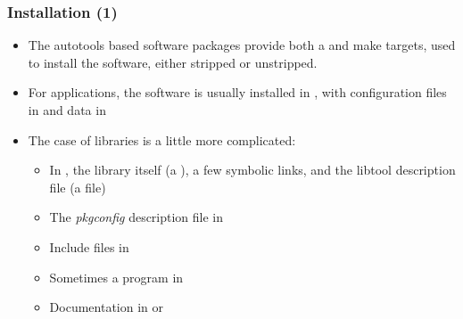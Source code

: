\begin{frame}
  \frametitle{Installation (1)}
  \begin{itemize}
  \item The autotools based software packages provide both a
     and  make targets, used to
    install the software, either stripped or unstripped.
  \item For applications, the software is usually installed in
    , with configuration files in
     and data in
  \item The case of libraries is a little more complicated:
    \begin{itemize}
    \item In , the library itself (a
      ), a few symbolic links, and
      the libtool description file (a  file)
    \item The {\em pkgconfig} description file in
    \item Include files in 
    \item Sometimes a  program in
    \item Documentation in  or
    \end{itemize}
  \end{itemize}
\end{frame}

